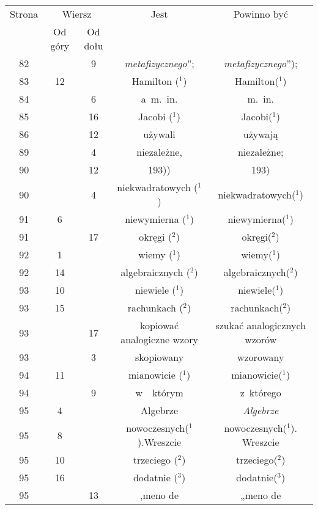 \documentclass[a4paper,11pt]{article}
\begin{document}
\begin{center}
  \newpage

  \begin{tabular}{|c|c|c|c|c|}
    \hline
    Strona & \multicolumn{2}{c|}{Wiersz} & Jest
                              & Powinno być \\ \cline{2-3}
    & Od góry & Od dołu & & \\
    \hline
    82  & &  9 & \textit{metafizycznego}”; & \textit{metafizycznego}”); \\
    83  & 12 & & Hamilton ($^{ 1 }$) & Hamilton($^{ 1 }$) \\
    84  & &  6 & a~m.~in. & m.~in. \\
    85  & & 16 & Jacobi ($^{ 1 }$) & Jacobi($^{ 1 }$) \\
    86  & & 12 & używali & używają \\
    89  & &  4 & niezależne, & niezależne; \\
    90  & & 12 & 193)) & 193) \\
    90  & &  4 & niekwadratowych ($^{ 1 }$) & niekwadratowych($^{ 1 }$) \\
    91  &  6 & & niewymierna ($^{ 1 }$) & niewymierna($^{ 1 }$) \\
    91  & & 17 & okręgi ($^{ 2 }$) & okręgi($^{ 2 }$) \\
    92  &  1 & & wiemy ($^{ 1 }$) & wiemy($^{ 1 }$) \\
    92  & 14 & & algebraicznych ($^{ 2 }$) & algebraicznych($^{ 2 }$) \\
    93  & 10 & & niewiele ($^{ 1 }$) & niewiele($^{ 1 }$) \\
    93  & 15 & & rachunkach ($^{ 2 }$) & rachunkach($^{ 2 }$) \\
    93  & & 17 & kopiować analogiczne wzory & szukać analogicznych
                                              wzorów \\
    93  & &  3 & skopiowany & wzorowany \\
    94  & 11 & & mianowicie ($^{ 1 }$) & mianowicie($^{ 1 }$) \\
    94  & &  9 & w~~którym & z~którego \\
    95  &  4 & & Algebrze & \textit{Algebrze} \\
    95  &  8 & & nowoczesnych($^{ 1 }$).Wreszcie
           & nowoczesnych($^{ 1 }$). Wreszcie \\
    95  & 10 & & trzeciego ($^{ 2 }$) & trzeciego($^{ 2 }$) \\
    95  & 16 & & dodatnie ($^{ 3 }$) & dodatnie($^{ 3 }$) \\
    95  & & 13 & ,meno de & „meno de \\

\end{tabular}
\end{center}
\end{document}
